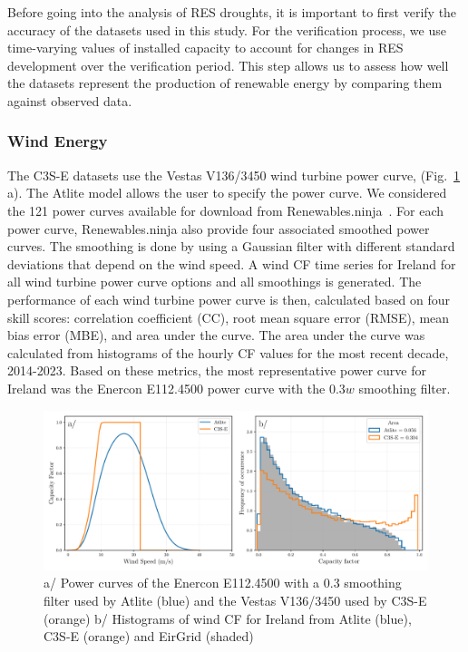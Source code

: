 \documentclass[a4paper, 11pt]{article}
\begin{document}
Before going into the analysis of RES droughts, it is important to first verify the accuracy of the datasets used in this study. For the verification process, we use time-varying values of installed capacity to account for changes in RES development over the verification period. This step allows us to assess how well the datasets represent the production of renewable energy by comparing them against observed data.
	
\subsubsection{Wind Energy}
\label{sec:wind_verification}

The C3S-E datasets use the Vestas V136/3450 wind turbine power curve, (Fig.~\ref{fig:power_curve} a). The Atlite model allows the user to specify the power curve. We considered the 121 power curves available for download from Renewables.ninja~\cite{staffell2016wake}. For each power curve, Renewables.ninja also provide four associated smoothed power curves. The smoothing is done by using a Gaussian filter with different standard deviations that depend on the wind speed. A wind CF time series for Ireland for all wind turbine power curve options and all smoothings is generated. The performance of each wind turbine power curve is then, calculated based on four skill scores: correlation coefficient (CC), root mean square error (RMSE), mean bias error (MBE), and area under the curve. The area under the curve was calculated from histograms of the hourly CF values for the most recent decade, 2014-2023. Based on these metrics, the most representative power curve for Ireland was the Enercon E112.4500 power curve with the $0.3w$  smoothing filter.

\begin{figure}[!ht]
	\centering
	\includegraphics[width=\textwidth]{power_curve}
	\caption{a/ Power curves of the Enercon E112.4500 with a 0.3 smoothing filter used by Atlite (blue) and the Vestas V136/3450 used by C3S-E (orange) b/ Histograms of wind CF for Ireland from Atlite (blue), C3S-E (orange) and EirGrid (shaded)}
	\label{fig:power_curve}
\end{figure}
\end{document}
